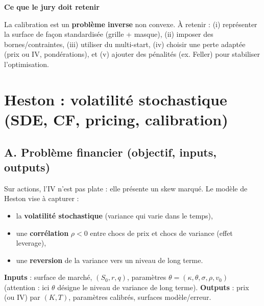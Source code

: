 \documentclass[11pt,a4paper]{report}
\theoremstyle{definition}
\theoremstyle{plain}
\theoremstyle{remark}
\newcommand{\1}{\mathbf{1}}
\newcommand{\codeid}[1]{\texttt{\detokenize{#1}}}
\newenvironment{jurybox}{
\par\medskip
\begin{lrbox}{\juryboxbox}
\begin{minipage}{0.97\textwidth}
\textbf{Ce que le jury doit retenir}\par\smallskip
\ignorespaces
}{
\unskip\end{minipage}
\end{lrbox}
\noindent\fcolorbox{black!30}{black!3}{\usebox{\juryboxbox}}
\par\medskip
}
\begin{document}

\begin{jurybox}
La calibration est un \textbf{problème inverse} non convexe. À retenir : (i) représenter la surface de façon standardisée (grille + masque), (ii) imposer des bornes/contraintes, (iii) utiliser du multi-start, (iv) choisir une perte adaptée (prix ou IV, pondérations), et (v) ajouter des pénalités (ex. Feller) pour stabiliser l'optimisation.
\end{jurybox}

\chapter{Heston : volatilité stochastique (SDE, CF, pricing, calibration)}

\section{A. Problème financier (objectif, inputs, outputs)}
Sur actions, l'IV n'est pas plate : elle présente un skew marqué. Le modèle de Heston vise à capturer :
\begin{itemize}[leftmargin=*]
\item la \textbf{volatilité stochastique} (variance qui varie dans le temps),
\item une \textbf{corrélation} $\rho<0$ entre chocs de prix et chocs de variance (effet leverage),
\item une \textbf{reversion} de la variance vers un niveau de long terme.
\end{itemize}
\textbf{Inputs} : surface de marché, $(S_0,r,q)$, paramètres $\theta=(\kappa,\theta,\sigma,\rho,v_0)$ (attention : ici $\theta$ désigne le niveau de variance de long terme).
\textbf{Outputs} : prix (ou IV) par $(K,T)$, paramètres calibrés, surfaces modèle/erreur.
\end{document}
